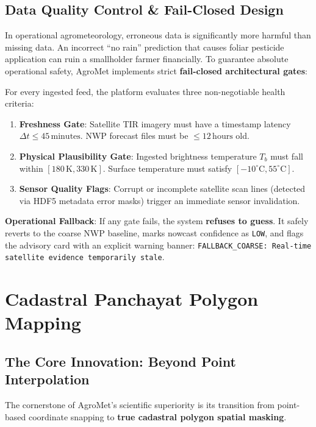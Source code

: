 \documentclass[11pt,a4paper,oneside]{report}
\begin{document}
\section{Data Quality Control \& Fail-Closed Design}
In operational agrometeorology, erroneous data is significantly more harmful than missing data. An incorrect ``no rain'' prediction that causes foliar pesticide application can ruin a smallholder farmer financially. To guarantee absolute operational safety, AgroMet implements strict \textbf{fail-closed architectural gates}:

\begin{definitionbox}
For every ingested feed, the platform evaluates three non-negotiable health criteria:
\begin{enumerate}
    \item \textbf{Freshness Gate}: Satellite TIR imagery must have a timestamp latency $\Delta t \le 45\,\text{minutes}$. NWP forecast files must be $\le 12\,\text{hours}$ old.
    \item \textbf{Physical Plausibility Gate}: Ingested brightness temperature $T_b$ must fall within $[180\,\text{K}, 330\,\text{K}]$. Surface temperature must satisfy $[-10^\circ\text{C}, 55^\circ\text{C}]$.
    \item \textbf{Sensor Quality Flags}: Corrupt or incomplete satellite scan lines (detected via HDF5 metadata error masks) trigger an immediate sensor invalidation.
\end{enumerate}
\textbf{Operational Fallback}: If any gate fails, the system \textbf{refuses to guess}. It safely reverts to the coarse NWP baseline, marks nowcast confidence as \texttt{LOW}, and flags the advisory card with an explicit warning banner: \texttt{FALLBACK\_COARSE: Real-time satellite evidence temporarily stale}.
\end{definitionbox}

\chapter{Cadastral Panchayat Polygon Mapping}

\section{The Core Innovation: Beyond Point Interpolation}
The cornerstone of AgroMet's scientific superiority is its transition from point-based coordinate snapping to \textbf{true cadastral polygon spatial masking}. 
\end{document}
